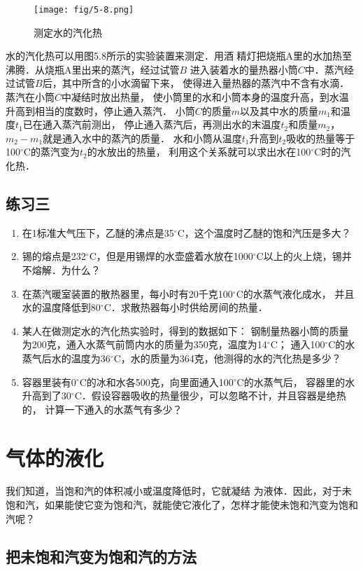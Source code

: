 \begin{figure}[htp]
\centering
\texttt{[image: fig/5-8.png]}
\caption{测定水的汽化热}
\end{figure}

水的汽化热可以用图5.8所示的实验装置来测定．用酒
精灯把烧瓶A里的水加热至沸腾．从烧瓶A里出来的蒸汽，经过试管$B$
进入装着水的量热器小筒$C$中．蒸汽经过试管$B$后，其中所含的小水滴留下来，
使得进入量热器的蒸汽中不含有水滴．蒸汽在小筒$C$中凝结时放出热量，
使小筒里的水和小筒本身的温度升高，到水温升高到相当的度数时，停止通入蒸汽．
小筒$C$的质量$m$以及其中水的质量$m_1$和温度$t_1$已在通入蒸汽前测出，
停止通入蒸汽后，再测出水的末温度$t_2$和质量$m_2$，$m_2-m_1$就是通入水中的蒸汽的质量．
水和小筒从温度$t_1$升高到$t_2$吸收的热量等于100$^\circ$C的蒸汽变为$t_2$的水放出的热量，
利用这个关系就可以求出水在100$^\circ$C时的汽化热．

\subsection*{练习三}
\begin{enumerate}
 \item 在1标准大气压下，乙醚的沸点是35$^\circ$C，这个温度时乙醚的饱和汽压是多大？
  \item 锡的熔点是232$^\circ$C，但是用锡焊的水壶盛着水放在1000$^\circ$C以上的火上烧，锡并不熔解．为什么？
  \item 在蒸汽暖室装置的散热器里，每小时有20千克100$^\circ$C的水蒸气液化成水，
    并且水的温度降低到80$^\circ$C．求散热器每小时供给房间的热量．
    \item 某人在做测定水的汽化热实验时，得到的数据如下：
   钢制量热器小筒的质量为200克，通入水蒸气前筒内水的质量为350克，温度为14$^\circ$C；
    通入100$^\circ$C的水蒸气后水的温度为36$^\circ$C，水的质量为364克，他测得的水的汽化热是多少？
    \item 容器里装有0$^\circ$C的冰和水各500克，向里面通入100$^\circ$C的水蒸气后，
    容器里的水升高到了30$^\circ$C．假设容器吸收的热量很少，可以忽略不计，并且容器是绝热的，
    计算一下通入的水蒸气有多少？
\end{enumerate}

\section{气体的液化}
我们知道，当饱和汽的体积减小或温度降低时，它就凝结
为液体．因此，对于未饱和汽，如果能使它变为饱和汽，就能使它液化了，怎样才能使未饱和汽变为饱和汽呢？

\subsection{把未饱和汽变为饱和汽的方法}

